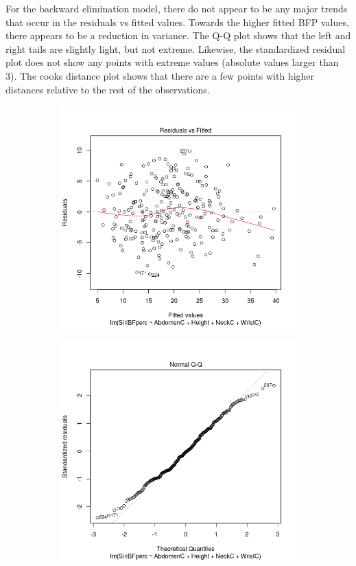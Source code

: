 \documentclass[a4paper, 11pt]{article}
\begin{document}
For the backward elimination model, there do not appear to be any major trends that occur in the residuals vs fitted values. Towards the higher fitted BFP values, there appears to be a reduction in variance. The Q-Q plot shows that the left and right tails are slightly light, but not extreme. Likewise, the standardized residual plot does not show any points with extreme values (absolute values larger than 3). The cooks distance plot shows that there are a few points with higher distances relative to the rest of the observations.
\begin{figure}[H]
  \begin{subfigure}[t]{.5\textwidth}
    \centering
    \includegraphics[width=\linewidth]{bwd_resid.png}
  \end{subfigure}
  \hfill
  \begin{subfigure}[t]{.5\textwidth}
    \centering
    \includegraphics[width=\linewidth]{bwd_qq.png}

\end{subfigure}
\end{figure}
\end{document}
